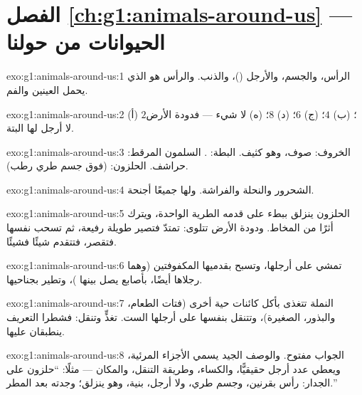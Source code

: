 \section*{الفصل \ref{ch:g1:animals-around-us} --- الحيوانات من حولنا}

\begin{solution}{exo:g1:animals-around-us:1}
الرأس، والجسم، والأرجل ()، والذنب. والرأس هو الذي يحمل
العينين والفم.
\end{solution}

\begin{solution}{exo:g1:animals-around-us:2}
(أ) $2$؛ (ب) $4$؛ (ج) $6$؛ (د) $8$؛ (ه) لا شيء --- فدودة الأرض
لا أرجل لها البتة.
\end{solution}

\begin{solution}{exo:g1:animals-around-us:3}
الخروف: صوف، وهو  كثيف. البطة: . السلمون المرقط: حراشف.
الحلزون:  (فوق جسم طري رطب).
\end{solution}

\begin{solution}{exo:g1:animals-around-us:4}
الشحرور والنحلة والفراشة. ولها جميعًا أجنحة.
\end{solution}

\begin{solution}{exo:g1:animals-around-us:5}
الحلزون ينزلق ببطء على قدمه الطرية الواحدة، ويترك أثرًا من المخاط.
ودودة الأرض تتلوى: تمتدّ فتصير طويلة رفيعة، ثم تسحب نفسها فتقصر،
فتتقدم شيئًا فشيئًا.
\end{solution}

\begin{solution}{exo:g1:animals-around-us:6}
تمشي على أرجلها، وتسبح بقدميها المكفوفتين (وهما رجلاها أيضًا،
بأصابع يصل بينها )، وتطير بجناحيها.
\end{solution}

\begin{solution}{exo:g1:animals-around-us:7}
النملة تتغذى بأكل كائنات حية أخرى (فتات الطعام، والبذور،
 الصغيرة)، وتتنقل بنفسها على أرجلها الست. تغذٍّ وتنقل:
فشطرا التعريف ينطبقان عليها.
\end{solution}

\begin{solution}{exo:g1:animals-around-us:8}
الجواب مفتوح. والوصف الجيد يسمي الأجزاء المرئية، ويعطي عدد أرجل
حقيقيًّا، والكساء، وطريقة التنقل، والمكان --- مثلًا: ``حلزون على
الجدار: رأس بقرنين، وجسم طري، ولا أرجل،  بنية، وهو ينزلق؛
وجدته بعد المطر.''
\end{solution}

